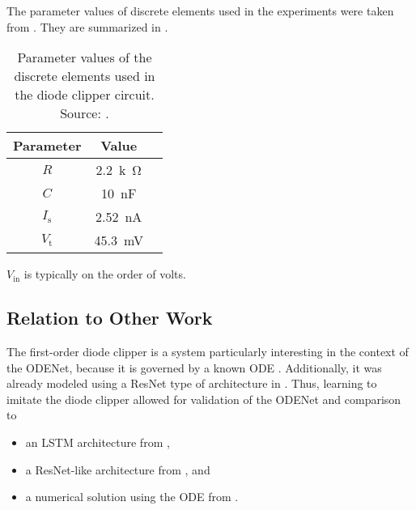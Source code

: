 The parameter values of discrete elements used in the experiments were taken from \cite{Yeh2008}. They are summarized in .

\begin{table}
  \centering
  \caption{Parameter values of the discrete elements used in the diode clipper circuit. Source: \cite{Yeh2008}.}
  \begin{tabular}{|c|c|c|}
    \hline
    Parameter & Value \\
    \hline
    $R$ & \SI{2.2}{k\ohm} \\
    $C$ & \SI{10}{nF} \\
    $I_\text{s}$ & \SI{2.52}{nA} \\
    $V_\text{t}$ & \SI{45.3}{mV} \\
    \hline
  \end{tabular}
  \label{tab:diode_clipper_element_parameters}
\end{table}

$V_\text{in}$ is typically on the order of volts.

\subsection{Relation to Other Work}

The first-order diode clipper is a system particularly interesting in the context of the ODENet, because it is governed by a known \ac{ODE} \cite{Yeh2007,Yeh2008}. Additionally, it was already modeled using a \ac{ResNet} type of architecture in \cite{Parker2019}. Thus, learning to imitate the diode clipper allowed for validation of the ODENet and comparison to 
\begin{itemize}
    \item an \ac{LSTM} architecture from \cite{Wrightetal2020},
    \item a \ac{ResNet}-like architecture from \cite{Parker2019}, and
    \item a numerical solution using the \ac{ODE} from \cite{Yeh2007,Yeh2008}.
\end{itemize}
